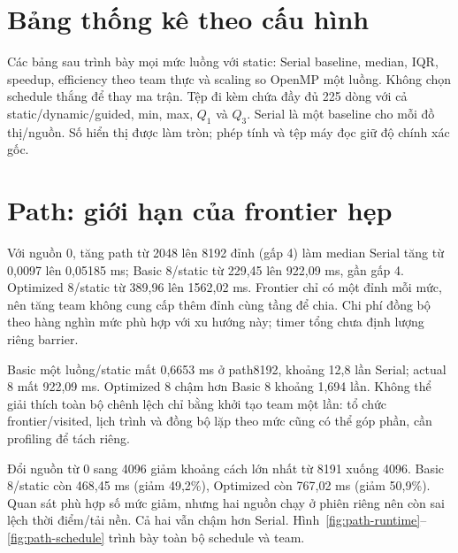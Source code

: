 \section{Bảng thống kê theo cấu hình}
Các bảng sau trình bày mọi mức luồng với static: Serial baseline, median, IQR, speedup, efficiency theo team thực và scaling so OpenMP một luồng. Không chọn schedule thắng để thay ma trận. Tệp đi kèm  chứa đầy đủ 225 dòng với cả static/dynamic/guided, min, max, $Q_1$ và $Q_3$. Serial là một baseline cho mỗi đồ thị/nguồn. Số hiển thị được làm tròn; phép tính và tệp máy đọc giữ độ chính xác gốc.

\clearpage

\section{Path: giới hạn của frontier hẹp}
Với nguồn 0, tăng path từ 2048 lên 8192 đỉnh (gấp 4) làm median Serial tăng từ 0,0097 lên 0,05185 ms; Basic 8/static từ 229,45 lên 922,09 ms, gần gấp 4. Optimized 8/static từ 389,96 lên 1562,02 ms. Frontier chỉ có một đỉnh mỗi mức, nên tăng team không cung cấp thêm đỉnh cùng tầng để chia. Chi phí đồng bộ theo hàng nghìn mức phù hợp với xu hướng này; timer tổng chưa định lượng riêng barrier.

Basic một luồng/static mất 0,6653 ms ở path8192, khoảng 12,8 lần Serial; actual 8 mất 922,09 ms. Optimized 8 chậm hơn Basic 8 khoảng 1,694 lần. Không thể giải thích toàn bộ chênh lệch chỉ bằng khởi tạo team một lần: tổ chức frontier/visited, lịch trình và đồng bộ lặp theo mức cũng có thể góp phần, cần profiling để tách riêng.

Đổi nguồn từ 0 sang 4096 giảm khoảng cách lớn nhất từ 8191 xuống 4096. Basic 8/static còn 468,45 ms (giảm 49,2\%), Optimized còn 767,02 ms (giảm 50,9\%). Quan sát phù hợp số mức giảm, nhưng hai nguồn chạy ở phiên riêng nên còn sai lệch thời điểm/tải nền. Cả hai vẫn chậm hơn Serial. Hình~\ref{fig:path-runtime}--\ref{fig:path-schedule} trình bày toàn bộ schedule và team.

